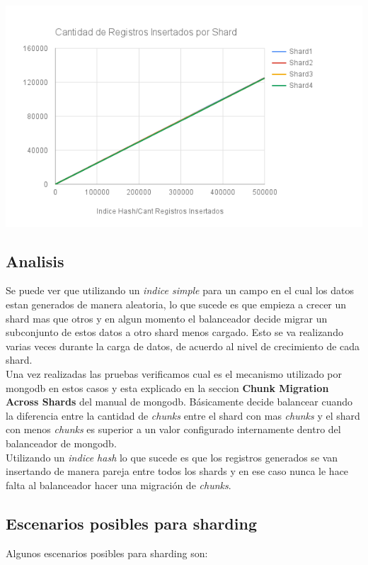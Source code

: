  \includegraphics[width=\linewidth]{IndiceHashChart.png}
 
\pagebreak
\subsection{Analisis}

Se puede ver que  utilizando un \textit{indice simple} para un campo en el cual los datos estan generados de manera aleatoria, lo que sucede es que empieza a crecer un shard mas que otros y en algun momento el balanceador decide migrar un subconjunto de estos datos a otro shard menos cargado. Esto se va realizando varias veces durante la carga de datos, de acuerdo al nivel de crecimiento de cada shard.\\
Una vez realizadas las pruebas verificamos cual es el mecanismo utilizado por mongodb en estos casos y esta explicado en la seccion \textbf{Chunk Migration Across Shards} del manual de mongodb. Básicamente decide balancear cuando la diferencia entre la cantidad de \textit{chunks} entre el shard con mas \textit{chunks}  y el shard con menos \textit{chunks} es superior a un valor configurado internamente dentro del balanceador de mongodb.\\
Utilizando un \textit{indice hash} lo que sucede es que los registros generados se van insertando de manera pareja entre todos los shards y en ese caso nunca le hace falta al balanceador hacer una migración de \textit{chunks}.

\subsection{Escenarios posibles para sharding}
Algunos escenarios posibles para sharding son:\\

